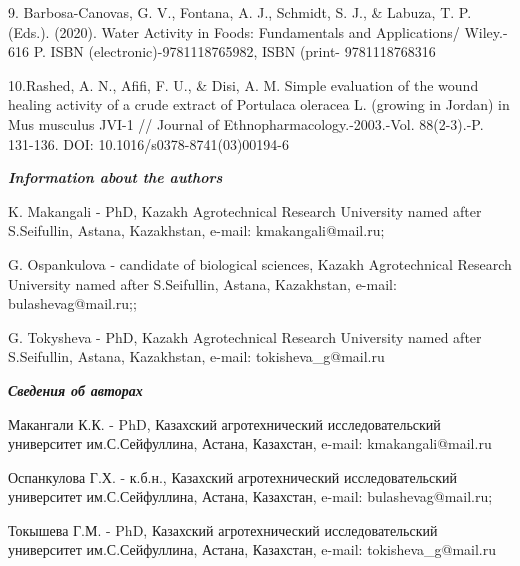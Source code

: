 9. Barbosa-Canovas, G. V., Fontana, A. J., Schmidt, S. J., \& Labuza, T.
P. (Eds.). (2020). Water Activity in Foods: Fundamentals and
Applications/ Wiley.- 616 P. ISBN (electronic)-9781118765982, ISBN
(print- 9781118768316

10.Rashed, A. N., Afifi, F. U., \& Disi, A. M. Simple evaluation of the
wound healing activity of a crude extract of Portulaca oleracea L.
(growing in Jordan) in Mus musculus JVI-1 // Journal of
Ethnopharmacology.-2003.-Vol. 88(2-3).-P. 131-136. DOI:
10.1016/s0378-8741(03)00194-6

\emph{{\bfseries Information about the authors}}

K. Makangali - PhD, Kazakh Agrotechnical Research University named after
S.Seifullin, Astana, Kazakhstan, e-mail: kmakangali@mail.ru;

G. Ospankulova - candidate of biological sciences, Kazakh Agrotechnical
Research University named after S.Seifullin, Astana, Kazakhstan, e-mail:
bulashevag@mail.ru;;

G. Tokysheva - PhD, Kazakh Agrotechnical Research University named after
S.Seifullin, Astana, Kazakhstan, e-mail: tokisheva\_g@mail.ru

\emph{{\bfseries Сведения об авторах}}

Макангали К.К. - PhD, Казахский агротехнический исследовательский
университет им.С.Сейфуллина, Астана, Казахстан, e-mail:
kmakangali@mail.ru

Оспанкулова Г.Х. - к.б.н., Казахский агротехнический исследовательский
университет им.С.Сейфуллина, Астана, Казахстан, e-mail:
bulashevag@mail.ru;

Токышева Г.М. - PhD, Казахский агротехнический исследовательский
университет им.С.Сейфуллина, Астана, Казахстан, e-mail:
tokisheva\_g@mail.ru












